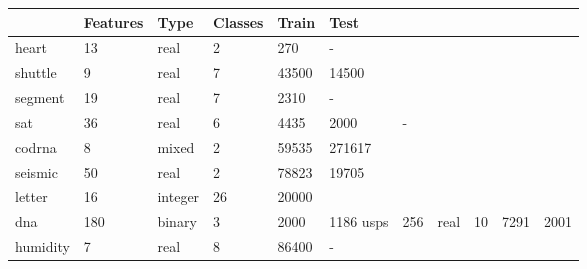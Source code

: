 \begin{tabular}{|l|lllll|}
	\hline
	& Features & Type & Classes & Train & Test \\\hline
	heart & 13 & real & 2 & 270 & - \\
	shuttle & 9 & real & 7 & 43500 & 14500 \\
	segment & 19 & real & 7 & 2310 & - \\
	sat & 36 & real & 6 & 4435 & 2000 & - \\
	codrna & 8 & mixed & 2 & 59535 & 271617 \\
	seismic & 50 & real & 2 & 78823 & 19705 \\
	letter & 16 & integer & 26 & 20000 & \\
	dna & 180 & binary & 3 & 2000 & 1186
	usps & 256 & real & 10 & 7291 & 2001 \\
	humidity & 7 & real & 8 & 86400 & -
\end{tabular}

